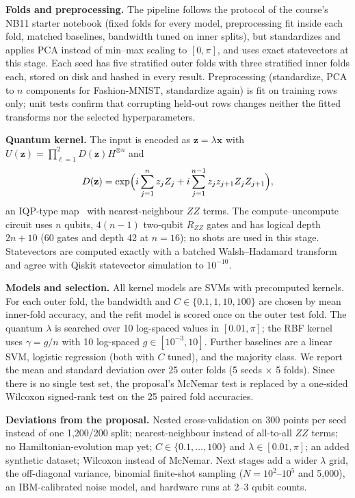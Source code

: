 \documentclass[conference]{IEEEtran}
\begin{document}
\textbf{Folds and preprocessing.} The pipeline follows the protocol of the course's NB11 starter notebook (fixed folds for every model, preprocessing fit inside each fold, matched baselines, bandwidth tuned on inner splits), but standardizes and applies PCA instead of min--max scaling to $[0,\pi]$, and uses exact statevectors at this stage. Each seed has five stratified outer folds with three stratified inner folds each, stored on disk and hashed in every result. Preprocessing (standardize, PCA to $n$ components for Fashion-MNIST, standardize again) is fit on training rows only; unit tests confirm that corrupting held-out rows changes neither the fitted transforms nor the selected hyperparameters.

\textbf{Quantum kernel.} The input is encoded as $\mathbf{z}=\lambda\mathbf{x}$ with $U(\mathbf{z})=\prod_{\ell=1}^{2}D(\mathbf{z})H^{\otimes n}$ and
\begin{equation}
D(\mathbf{z})=\exp\Bigl(i\sum_{j=1}^{n} z_j Z_j + i\sum_{j=1}^{n-1} z_j z_{j+1} Z_j Z_{j+1}\Bigr),
\end{equation}
an IQP-type map~\cite{havlicek2019supervised} with nearest-neighbour $ZZ$ terms. The compute--uncompute circuit uses $n$ qubits, $4(n-1)$ two-qubit $R_{ZZ}$ gates and has logical depth $2n+10$ (60 gates and depth 42 at $n=16$); no shots are used in this stage. Statevectors are computed exactly with a batched Walsh--Hadamard transform and agree with Qiskit statevector simulation to $10^{-10}$.

\textbf{Models and selection.} All kernel models are SVMs with precomputed kernels. For each outer fold, the bandwidth and $C\in\{0.1,1,10,100\}$ are chosen by mean inner-fold accuracy, and the refit model is scored once on the outer test fold. The quantum $\lambda$ is searched over 10 log-spaced values in $[0.01,\pi]$; the RBF kernel uses $\gamma=g/n$ with 10 log-spaced $g\in[10^{-3},10]$. Further baselines are a linear SVM, logistic regression (both with $C$ tuned), and the majority class. We report the mean and standard deviation over 25 outer folds (5 seeds $\times$ 5 folds). Since there is no single test set, the proposal's McNemar test is replaced by a one-sided Wilcoxon signed-rank test on the 25 paired fold accuracies.

\textbf{Deviations from the proposal.} Nested cross-validation on 300 points per seed instead of one 1{,}200/200 split; nearest-neighbour instead of all-to-all $ZZ$ terms; no Hamiltonian-evolution map yet; $C\in\{0.1,\dots,100\}$ and $\lambda\in[0.01,\pi]$; an added synthetic dataset; Wilcoxon instead of McNemar. Next stages add a wider $\lambda$ grid, the off-diagonal variance, binomial finite-shot sampling ($N=10^{2}$--$10^{5}$ and 5{,}000), an IBM-calibrated noise model, and hardware runs at 2--3 qubit counts.
\end{document}
